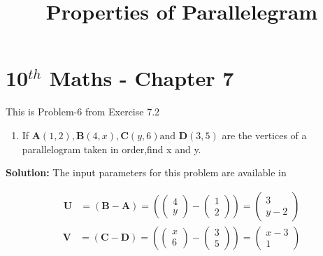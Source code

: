 \documentclass[12pt]{article}
\providecommand{\brak}[1]{\ensuremath{\left(#1\right)}}
\newcommand{\solution}{\noindent \textbf{Solution: }}
\newcommand{\myvec}[1]{\ensuremath{\begin{pmatrix}#1\end{pmatrix}}}
\let\vec\mathbf
\begin{document}
\begin{center}
\title{\textbf{Properties of Parallelegram}}
\date{\vspace{-5ex}} %
\maketitle
\end{center}

\setcounter{page}{1}

\section{10$^{th}$ Maths - Chapter 7}

This is Problem-6 from Exercise 7.2

\begin{enumerate}
\item If $\vec{A}(1, 2),\vec{B}(4, x),\vec{C}(y, 6) \text{and } \vec{D}(3, 5)$ are the vertices of a parallelogram taken in order,find x and y.
\end{enumerate}

\solution The input parameters for this problem are available in
\begin{center}
\begin{table}[ht!]
	
\caption{}
\label{table}	
\end{table}
\end{center}
\begin{align}
  \label{eq:det2f}
  \vec{U} &=\brak{\vec{B}-\vec{A}} = \brak{\myvec{4 \\y } - \myvec{1 \\2 } } = \myvec{3 \\y-2 }
 \end{align}
 \begin{align}
   \vec{V} &= \brak{\vec{C}-\vec{D}} = \brak{\myvec{x \\6 } - \myvec{3 \\5 } } = \myvec{x-3 \\1}   
 \end{align}
  
\end{document}
